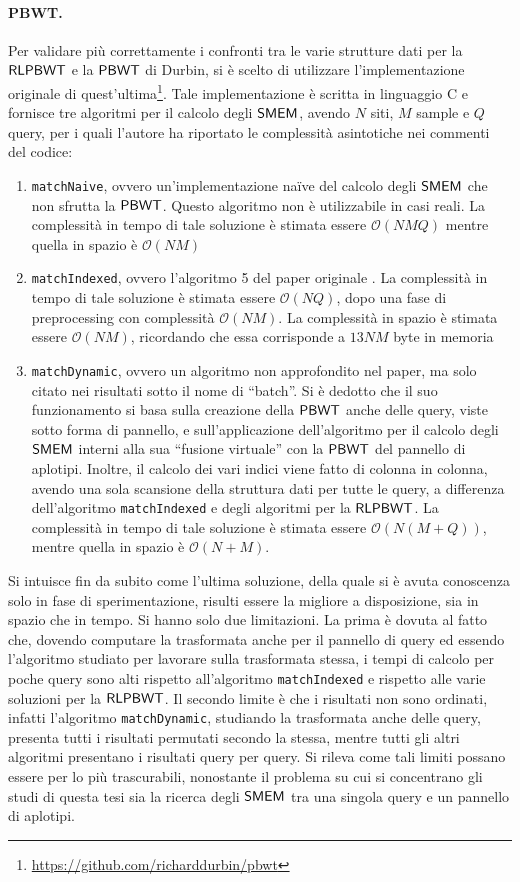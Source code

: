 \paragraph{PBWT.}
Per validare più correttamente i confronti tra le varie strutture dati
per la $\mbox{\rm {\sf RLPBWT}}$ e la $\mbox{\rm {\sf PBWT}}$ di Durbin, si è scelto di utilizzare
l'implementazione originale di
quest'ultima\footnote{\url{https://github.com/richarddurbin/pbwt}}. Tale
implementazione è scritta in 
linguaggio C e
fornisce tre algoritmi per il calcolo degli $\mbox{\rm {\sf SMEM}}$, avendo $N$ siti, $M$ sample
e $Q$ query, per i quali l'autore ha riportato le complessità asintotiche 
nei commenti del codice: 
\begin{enumerate}
  \item \texttt{matchNaive}, ovvero un'implementazione na\"{i}ve del calcolo
  degli $\mbox{\rm {\sf SMEM}}$ che non sfrutta la $\mbox{\rm {\sf PBWT}}$. Questo algoritmo non è
  utilizzabile in casi reali. La complessità in tempo di tale 
  soluzione è stimata essere $\mathcal{O}(NMQ)$ mentre quella in spazio è
  $\mathcal{O}(NM)$
  \item \texttt{matchIndexed}, ovvero l'algoritmo 5 del paper originale
  \cite{pbwt}. La complessità in tempo di tale 
  soluzione è stimata essere $\mathcal{O}(NQ)$, dopo una fase di preprocessing
  con complessità $\mathcal{O}(NM)$. La complessità in spazio è stimata essere
  $\mathcal{O}(NM)$, ricordando che essa corrisponde a $13NM$
  byte in memoria
  \item \texttt{matchDynamic}, ovvero un algoritmo non approfondito nel paper,
  ma
  solo citato nei risultati sotto il nome di ``batch''.
  Si è dedotto che il suo funzionamento
  si basa sulla creazione della $\mbox{\rm {\sf PBWT}}$ anche delle query, viste 
  sotto forma di pannello, e sull'applicazione dell'algoritmo per il calcolo
  degli $\mbox{\rm {\sf SMEM}}$  
  interni alla sua ``fusione virtuale'' con la $\mbox{\rm {\sf PBWT}}$ del pannello di aplotipi.
  Inoltre, il calcolo dei vari indici viene
  fatto di colonna in colonna, avendo una sola scansione
  della struttura dati per tutte le query, a differenza dell'algoritmo
  \texttt{matchIndexed} e degli algoritmi per la $\mbox{\rm {\sf RLPBWT}}$.
  La complessità in tempo di tale 
  soluzione è stimata essere $\mathcal{O}(N(M+Q))$, mentre quella in spazio è
  $\mathcal{O}(N+M)$. 
\end{enumerate}
Si intuisce fin da subito come l'ultima soluzione, della quale si è avuta
conoscenza solo in fase di
sperimentazione, risulti essere la migliore a disposizione, sia in spazio che
in tempo. Si hanno solo due
limitazioni. La prima è dovuta al fatto che, dovendo computare
la trasformata anche per il pannello di query ed essendo l'algoritmo studiato
per lavorare sulla trasformata stessa, i tempi di calcolo per poche query sono
alti rispetto all'algoritmo \texttt{matchIndexed} e rispetto alle varie
soluzioni per la $\mbox{\rm {\sf RLPBWT}}$. Il secondo limite è che i risultati non sono
ordinati, infatti l'algoritmo \texttt{matchDynamic}, studiando la trasformata
anche delle query,
presenta tutti i risultati permutati secondo la stessa, mentre tutti gli altri
algoritmi presentano i risultati query per query. Si rileva
come tali limiti possano essere per lo più trascurabili, nonostante il problema
su
cui si concentrano gli studi di questa tesi sia la ricerca degli $\mbox{\rm {\sf SMEM}}$ tra
una 
singola query e un pannello di aplotipi.
